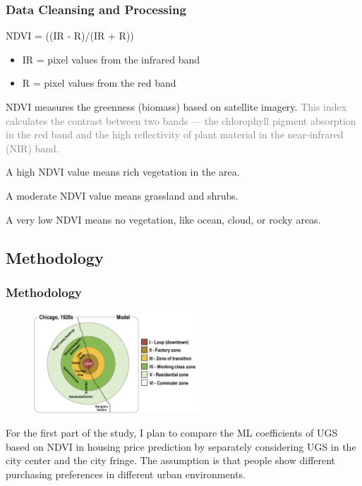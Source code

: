 \documentclass{beamer}
\begin{document}
\begin{frame}
\frametitle{Data Cleansing and Processing}

\centering
\alert{NDVI = ((IR - R)/(IR + R))}
\begin{itemize}
    \item IR = pixel values from the infrared band
    \item R = pixel values from the red band
\end{itemize}

NDVI measures the greenness (biomass) based on satellite imagery. \textcolor{gray}{This
index calculates the contrast between two bands — the chlorophyll pigment absorption in the red band and the high reflectivity of plant material in the near-infrared (NIR) band. }

    \item A high NDVI value means rich vegetation in the area. 

    \item A moderate NDVI value means grassland and shrubs. 
    
    \item A very low NDVI means no vegetation, like ocean, cloud, or rocky areas. 
\end{frame}



\subsection{Methodology}

\begin{frame}
\frametitle{Methodology}
\begin{figure}[h]
  \centering
  \includegraphics[width=0.55\textwidth]{Visual/concentric.jpg}
\end{figure}
For the first part of the study, I plan to compare the ML coefficients of UGS based on NDVI in housing price prediction by separately considering UGS in the city center and the city fringe. The assumption is that people show different purchasing preferences in different urban environments.

\end{frame}
\end{document}

